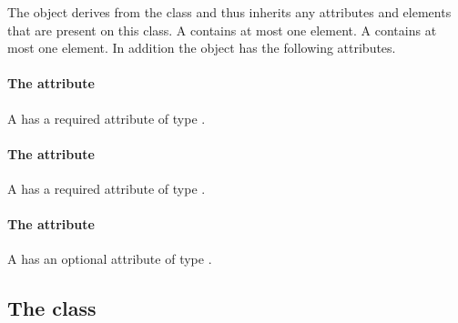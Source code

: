 


The \CoordinateComponent object derives from the \SBase class and thus
inherits any attributes and elements that are present on this class.
A \CoordinateComponent contains at most one \Boundary element.
A \CoordinateComponent contains at most one \Boundary element.
In addition the \CoordinateComponent object has the following
attributes.

\paragraph{The \fixttspace{} attribute}

A \CoordinateComponent has a required attribute  of type
.


\paragraph{The \fixttspace{} attribute}

A \CoordinateComponent has a required attribute  of type
.


\paragraph{The \fixttspace{} attribute}

A \CoordinateComponent has an optional attribute  of type
.


\subsection{The  class}
\label{sampledfieldgeometry-class}



